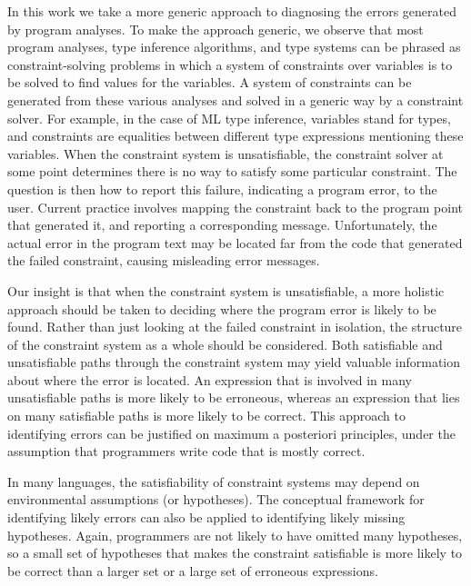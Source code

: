 In this work we take a more generic approach to diagnosing the errors
generated by program analyses.  To make the approach generic, we
observe that most program analyses, type inference algorithms, and
type systems can be phrased as constraint-solving problems in which a
system of constraints over variables is to be solved to find values
for the variables.  A system of constraints can be generated from
these various analyses and solved in a generic way by a constraint
solver. For example, in the case of ML type inference, variables
stand for types, and constraints are equalities between different
type expressions mentioning these variables. When the constraint
system is unsatisfiable, the constraint solver at some point
determines there is no way to satisfy some particular constraint. The
question is then how to report this failure, indicating a program
error, to the user. Current practice involves mapping the constraint
back to the program point that generated it, and reporting a
corresponding message. Unfortunately, the actual error in the program
text may be located far from the code that generated the failed
constraint, causing misleading error messages.

Our insight is that when the constraint system is unsatisfiable, a
more holistic approach should be taken to deciding where the program
error is likely to be found. Rather than just looking at the failed
constraint in isolation, the structure of the constraint system as
a whole should be considered. Both satisfiable and unsatisfiable
paths through the constraint system may yield valuable information
about where the error is located.  An expression that is involved
in many unsatisfiable paths is more likely to be erroneous, whereas
an expression that lies on many satisfiable paths is more likely to
be correct. This approach to identifying errors can be
justified on maximum a posteriori principles, under the assumption
that programmers write code that is mostly correct.

In many languages, the satisfiability of constraint systems may depend
on environmental assumptions (or hypotheses). The conceptual framework for identifying
likely errors can also be applied to identifying likely
missing hypotheses. Again, programmers are not likely to have omitted
many hypotheses, so a small set of hypotheses that makes the
constraint satisfiable is more likely to be correct than a larger
set or a large set of erroneous expressions.

